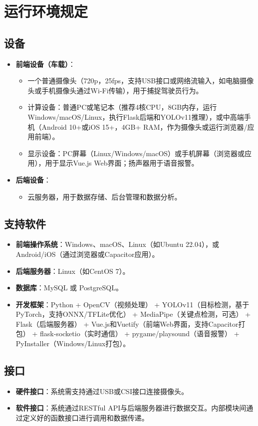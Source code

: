 \documentclass[a4paper,12pt]{article}
\begin{document}
\section{运行环境规定}

\subsection{设备}
\begin{itemize}
    \item \textbf{前端设备（车载）}：
    \begin{itemize}
        \item 一个普通摄像头（720p，25fps，支持USB接口或网络流输入，如电脑摄像头或手机摄像头通过Wi-Fi传输），用于捕捉驾驶员行为。
        \item 计算设备：普通PC或笔记本（推荐4核CPU，8GB内存，运行Windows/macOS/Linux，执行Flask后端和YOLOv11推理），或中高端手机（Android 10+或iOS 15+，4GB+ RAM，作为摄像头或运行浏览器/应用前端）。
        \item 显示设备：PC屏幕（Linux/Windows/macOS）或手机屏幕（浏览器或应用），用于显示Vue.js Web界面；扬声器用于语音报警。
    \end{itemize}
    \item \textbf{后端设备}：
    \begin{itemize}
        \item 云服务器，用于数据存储、后台管理和数据分析。
    \end{itemize}
\end{itemize}

\subsection{支持软件}
\begin{itemize}
    \item \textbf{前端操作系统}：Windows、macOS、Linux（如Ubuntu 22.04），或Android/iOS（通过浏览器或Capacitor应用）。
    \item \textbf{后端服务器}：Linux（如CentOS 7）。
    \item \textbf{数据库}：MySQL 或 PostgreSQL。
    \item \textbf{开发框架}：Python + OpenCV（视频处理） + YOLOv11（目标检测，基于PyTorch，支持ONNX/TFLite优化） + MediaPipe（关键点检测，可选） + Flask（后端服务器） + Vue.js和Vuetify（前端Web界面，支持Capacitor打包） + flask-socketio（实时通信） + pygame/playsound（语音报警） + PyInstaller（Windows/Linux打包）。
\end{itemize}

\subsection{接口}
\begin{itemize}
    \item \textbf{硬件接口}：系统需支持通过USB或CSI接口连接摄像头。
    \item \textbf{软件接口}：系统通过RESTful API与后端服务器进行数据交互。内部模块间通过定义好的函数接口进行调用和数据传递。
\end{itemize}
\end{document}
